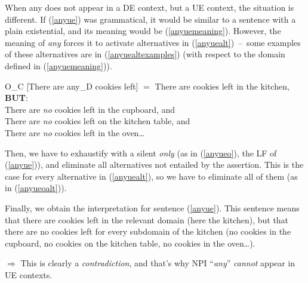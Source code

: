 \documentclass[a4paper,11pt]{article}
\newcommand{\reff}[1]{(\ref{#1})}
\newcommand{\exs}[2][]{\begin{exe}\ex #1 \begin{xlist}#2\end{xlist}\end{exe}}
\begin{document}
When any does not appear in a DE context, but a UE context, the situation is different. If \reff{anyue} was grammatical, it would be similar to a sentence with a plain existential, and its meaning would be \reff{anyuemeaning}. However, the meaning of \emph{any} forces it to activate alternatives in \reff{anyuealt}~--~some examples of these alternatives are in \reff{anyuealtexamples} (with respect to the domain defined in \reff{anyuemeaning}).

\exs{
	\ex\label{anyueo} O_C [There are any_D cookies left] $=$
	\ex\label{anyueoalt} There are cookies left in the kitchen, \textbf{BUT}:\\
						 There are \emph{no} cookies left in the cupboard, and\\
						 There are \emph{no} cookies left on the kitchen table, and\\
						 There are \emph{no} cookies left in the oven\ldots{}
}
%
Then, we have to exhaustify with a silent \emph{only} (as in \reff{anyueo}, the LF of \reff{anyue}), and eliminate all alternatives not entailed by the assertion. This is the case for every alternative in \reff{anyuealt}, so we have to eliminate all of them (as in \reff{anyueoalt}).

Finally, we obtain the interpretation for sentence \reff{anyue}. This sentence means that there are cookies left in the relevant domain (here the kitchen), but that there are no cookies left for every subdomain of the kitchen (no cookies in the cupboard, no cookies on the kitchen table, no cookies in the oven\ldots{}).

$\Rightarrow$ This is clearly a \emph{contradiction}, and that's why NPI \enquote{\emph{any}} \emph{cannot} appear in UE contexts.

\end{document}
